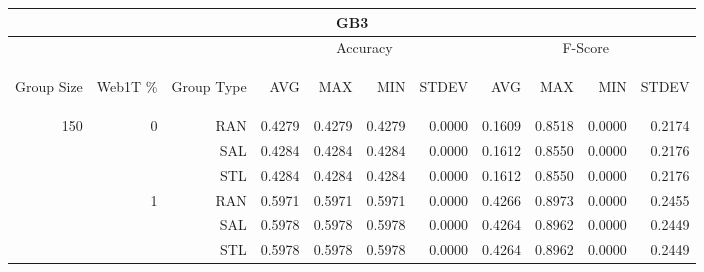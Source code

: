 \begin{center}
\begin{table}[htbp] 
 \begin{center}
\begin{tabular}{ | r | r | r | r | r | r | r | r | r | r | r |}
\hline
\multicolumn{11}{|c|}{GB3}\\
\hline
 & & & \multicolumn{4}{|c|}{Accuracy} & \multicolumn{4}{|c|}{F-Score}\\ \cline{4-11}
\begin{sideways}Group Size\end{sideways} & \begin{sideways}Web1T \%\end{sideways} & \begin{sideways}Group Type\end{sideways} & \begin{sideways}AVG\end{sideways} & \begin{sideways}MAX\end{sideways} & \begin{sideways}MIN\end{sideways} & \begin{sideways}STDEV\end{sideways} & \begin{sideways}AVG\end{sideways} & \begin{sideways}MAX\end{sideways} & \begin{sideways}MIN\end{sideways} & \begin{sideways}STDEV\end{sideways}\\
\hline
\multirow{18}{*}{150}
 & \multirow{3}{*}{0} & RAN & 0.4279 & 0.4279 & 0.4279 & 0.0000 & 0.1609 & 0.8518 & 0.0000 & 0.2174\\ \cline{3-11}
 &   & SAL & 0.4284 & 0.4284 & 0.4284 & 0.0000 & 0.1612 & 0.8550 & 0.0000 & 0.2176\\ \cline{3-11}
 &   & STL & 0.4284 & 0.4284 & 0.4284 & 0.0000 & 0.1612 & 0.8550 & 0.0000 & 0.2176\\ \cline{2-11}
 & \multirow{3}{*}{1} & RAN & 0.5971 & 0.5971 & 0.5971 & 0.0000 & 0.4266 & 0.8973 & 0.0000 & 0.2455\\ \cline{3-11}
 &   & SAL & 0.5978 & 0.5978 & 0.5978 & 0.0000 & 0.4264 & 0.8962 & 0.0000 & 0.2449\\ \cline{3-11}
 &   & STL & 0.5978 & 0.5978 & 0.5978 & 0.0000 & 0.4264 & 0.8962 & 0.0000 & 0.2449\\ \cline{2-11}

\end{tabular}
\end{center}
\end{table}
\end{center}
